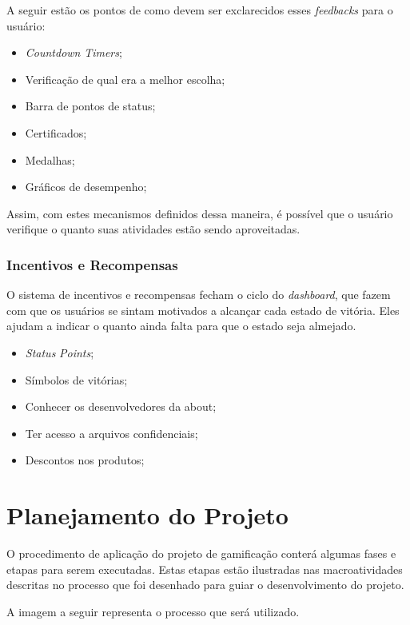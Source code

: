 A seguir estão os pontos  de como devem ser exclarecidos esses \textit{feedbacks} para o 
usuário:

\begin{itemize}
    \item \textit{Countdown} \textit{Timers};
    \item Verificação de qual era a melhor escolha;
    \item Barra de pontos de status;
    \item Certificados;
    \item Medalhas;
    \item Gráficos de desempenho;
\end{itemize}

Assim, com estes mecanismos definidos dessa maneira, é possível que o usuário verifique 
o quanto suas atividades estão sendo aproveitadas.

\subsubsection{Incentivos e Recompensas}
\label{sub:incentives_and_rewards}
O sistema de incentivos e recompensas fecham o ciclo do \textit{dashboard}, que fazem com que 
os usuários se sintam motivados a alcançar cada estado de vitória. Eles ajudam a indicar
o quanto ainda falta para que o estado seja almejado.

\begin{itemize}
    \item \textit{Status} \textit{Points};
    \item Símbolos de vitórias;
    \item Conhecer os desenvolvedores da about;
    \item Ter acesso a arquivos confidenciais;
    \item Descontos nos produtos;
\end{itemize}

\section{Planejamento do Projeto}
\label{sub:planejamento_do_projeto}
O procedimento de aplicação do projeto de gamificação conterá algumas fases
e etapas para serem executadas. Estas etapas estão ilustradas nas macroatividades 
descritas no processo que foi desenhado para guiar o desenvolvimento
do projeto.

A imagem a seguir representa o processo que será utilizado.

